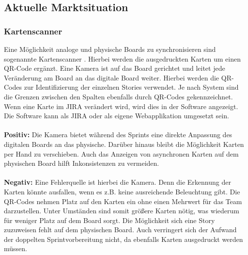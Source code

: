 \documentclass[12pt,titlepage]{scrartcl}
\begin{document}
		\subsection{Aktuelle Marktsituation}
		\subsubsection{Kartenscanner}
		Eine Möglichkeit analoge und physische Boards zu synchronisieren sind sogenannte Kartenscanner \cite{cardscanner, truffler}. Hierbei werden die ausgedruckten Karten um einen QR-Code ergänzt. Eine Kamera ist auf das Board gerichtet und leitet jede Veränderung am Board an das digitale Board weiter. Hierbei werden die QR-Codes zur Identifizierung der einzelnen Stories verwendet. Je nach System sind die Grenzen zwischen den Spalten ebenfalls durch QR-Codes gekennzeichnet. Wenn eine Karte im JIRA verändert wird, wird dies in der Software angezeigt. Die Software kann als JIRA oder als eigene Webapplikation umgesetzt sein. 
		\\ \\
		\textbf{Positiv: }Die Kamera bietet während des Sprints eine direkte Anpassung des digitalen Boards an das physische. Darüber hinaus bleibt die Möglichkeit Karten per Hand zu verschieben. Auch das Anzeigen von asynchronen Karten auf dem physischen Board hilft Inkonsistenzen zu vermeiden.
		\\ \\
		\textbf{Negativ: }Eine Fehlerquelle ist hierbei die Kamera. Denn die Erkennung der Karten könnte ausfallen, wenn es z.B. keine ausreichende Beleuchtung gibt. Die QR-Codes nehmen Platz auf den Karten ein ohne einen Mehrwert für das Team darzustellen. Unter Umständen sind somit größere Karten nötig, was wiederum für weniger Platz auf dem Board sorgt. Die Möglichkeit sich eine Story zuzuweisen fehlt auf dem physischen Board. Auch verringert sich der Aufwand der doppelten Sprintvorbereitung nicht, da ebenfalls Karten ausgedruckt werden müssen.
\end{document}
